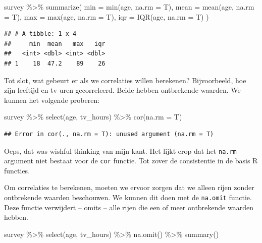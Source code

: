 \documentclass[]{tufte-book}
\newenvironment{Shaded}{}{}
\newcommand{\AttributeTok}[1]{\textcolor[rgb]{0.49,0.56,0.16}{#1}}
\newcommand{\FunctionTok}[1]{\textcolor[rgb]{0.02,0.16,0.49}{#1}}
\newcommand{\NormalTok}[1]{#1}
\newcommand{\SpecialCharTok}[1]{\textcolor[rgb]{0.25,0.44,0.63}{#1}}
\begin{document}
\begin{Shaded}
\begin{Highlighting}[]
\NormalTok{survey }\SpecialCharTok{\%\textgreater{}\%}
  \FunctionTok{summarize}\NormalTok{(}
    \AttributeTok{min =} \FunctionTok{min}\NormalTok{(age, }\AttributeTok{na.rm =}\NormalTok{ T),}
    \AttributeTok{mean =} \FunctionTok{mean}\NormalTok{(age, }\AttributeTok{na.rm =}\NormalTok{ T),}
    \AttributeTok{max =} \FunctionTok{max}\NormalTok{(age, }\AttributeTok{na.rm =}\NormalTok{ T),}
    \AttributeTok{iqr =} \FunctionTok{IQR}\NormalTok{(age, }\AttributeTok{na.rm =}\NormalTok{ T)}
\NormalTok{  )}
\end{Highlighting}
\end{Shaded}

\begin{verbatim}
## # A tibble: 1 x 4
##     min  mean   max   iqr
##   <int> <dbl> <int> <dbl>
## 1    18  47.2    89    26
\end{verbatim}

Tot slot, wat gebeurt er als we correlaties willen berekenen? Bijvoorbeeld, hoe zijn leeftijd en tv-uren gecorreleerd. Beide hebben ontbrekende waarden. We kunnen het volgende proberen:

\begin{Shaded}
\begin{Highlighting}[]
\NormalTok{survey }\SpecialCharTok{\%\textgreater{}\%}
  \FunctionTok{select}\NormalTok{(age, tv\_hours) }\SpecialCharTok{\%\textgreater{}\%}
  \FunctionTok{cor}\NormalTok{(}\AttributeTok{na.rm =}\NormalTok{ T)}
\end{Highlighting}
\end{Shaded}

\begin{verbatim}
## Error in cor(., na.rm = T): unused argument (na.rm = T)
\end{verbatim}

Oeps, dat was wishful thinking van mijn kant. Het lijkt erop dat het \texttt{na.rm} argument niet bestaat voor de \texttt{cor} functie. Tot zover de consistentie in de basis R functies.

Om correlaties te berekenen, moeten we ervoor zorgen dat we alleen rijen zonder ontbrekende waarden beschouwen. We kunnen dit doen met de \texttt{na.omit} functie. Deze functie verwijdert -- omits -- alle rijen die een of meer ontbrekende waarden hebben.

\begin{Shaded}
\begin{Highlighting}[]
\NormalTok{survey }\SpecialCharTok{\%\textgreater{}\%}
  \FunctionTok{select}\NormalTok{(age, tv\_hours) }\SpecialCharTok{\%\textgreater{}\%}
  \FunctionTok{na.omit}\NormalTok{() }\SpecialCharTok{\%\textgreater{}\%}
  \FunctionTok{summary}\NormalTok{()}
\end{Highlighting}
\end{Shaded}
\end{document}
